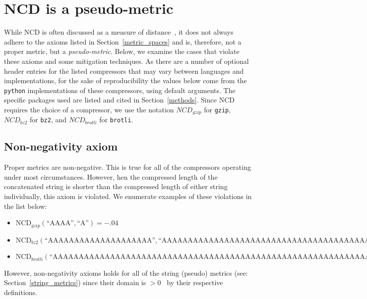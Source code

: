 \documentclass[preprint,12pt]{elsarticle}
\begin{document}
\section{NCD is a pseudo-metric}
\label{pseudometric}

While NCD is often discussed as a measure of distance~\cite{opitz2023gzip,weinreich2023parameter,nishida2011tweet,jiang2022less,ncd}, it does not always adhere to the axioms listed in Section~\ref{metric_spaces} and is, therefore, not a proper metric, but a \textit{pseudo-metric}.
Below, we examine the cases that violate these axioms and some mitigation techniques.
As there are a number of optional header entries for the listed compressors that may vary between languages and implementations, for the sake of reproducibility the values below come from the \texttt{python} implementations of these compressors, using default arguments.
The specific packages used are listed and cited in Section~\ref{methods}.
Since NCD requires the choice of a compressor, we use the notation $NCD_{gzip}$ for \texttt{gzip}, $NCD_{bz2}$ for \texttt{bz2}, and $NCD_{brotli}$ for \texttt{brotli}.


\subsection{Non-negativity axiom}
Proper metrics are non-negative.
This is true for all of the compressors operating under most circumstances.
However, hen the compressed length of the concatenated string is shorter than the compressed length of either string individually, this axiom is violated.
We enumerate examples of these violations in the list below:
\begin{itemize}
    \item $\text{NCD}_{gzip}(\text{``AAAA''}, \text{``A''}) = -.04$
    \item $\text{NCD}_{bz2}(\text{``AAAAAAAAAAAAAAAAAAAA''},\text{``AAAAAAAAAAAAAAAAAAAAAAAAAAAAAAAAAAAAAAAAAAAAAAAAAA''}) = -.05$
    \item $\text{NCD}_{brotli}(\text{``AAAAAAAAAAAAAAAAAAAAAAAAAAAAAAAAAAAAAAAAAAAAAAAAAAAAAAAAAAAAAAAAAAAAAAAAAAAAAAAAAA''}, \text{``AAAAAAAAAAAAAAAAAAAAAAAAAAAAAAAAAAAAAAAAAAAAAAAAAAAAAAAAAAAAAAAAAAAAAAAAAAAA''}) = -.17$
\end{itemize}
However, non-negativity axioms holds for all of the string (pseudo) metrics (see: Section~\ref{string_metrics}) since their domain is $>0$~\cite{metrics,levenshtein} by their respective definitions.
\end{document}
